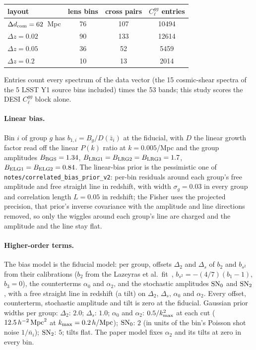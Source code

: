 \documentclass[11pt]{article}
\newcommand{\kmax}{k_{\rm max}}
\newcommand{\hMpc}{\,h/{\rm Mpc}}
\newcommand{\aunit}{\,h^{-2}\,{\rm Mpc}^2}
\newcommand{\dcom}{$\Delta d_{\rm com} = 62$~Mpc}
\newcommand{\us}{\_\allowbreak}
\begin{document}
\begin{center}
  \begin{tabular}{lccc}
    \hline
    layout & lens bins & cross pairs & $C_\ell^{gg}$ entries \\
    \hline
    \dcom{} & 76 & 107 & 10494 \\
    $\Delta z = 0.02$ & 90 & 133 & 12614 \\
    $\Delta z = 0.05$ & 36 & 52 & 5459 \\
    $\Delta z = 0.2$ & 10 & 13 & 2014 \\
    \hline
  \end{tabular}
\end{center}

\noindent Entries count every spectrum of the data vector (the 15
cosmic-shear spectra of the 5 LSST Y1 source bins included) times the
53 bands; this study scores the DESI $C_\ell^{gg}$ block alone.

\paragraph{Linear bias.}
Bin $i$ of group $g$ has $b_{1,i} = B_g/D(\bar{z}_i)$ at the fiducial,
with $D$ the linear growth factor read off the linear $P(k)$ ratio at
$k = 0.005$/Mpc and the group amplitudes $B_{\rm BGS} = 1.34$,
$B_{\rm LRG1} = B_{\rm LRG2} = B_{\rm LRG3} = 1.7$,
$B_{\rm ELG1} = B_{\rm ELG2} = 0.84$.  The linear-bias prior is the
pessimistic one of \texttt{notes/correlated\us bias\us prior\us v2}:
per-bin residuals around each group's free amplitude
and free straight line in redshift, with width $\sigma_g = 0.03$ in
every group and correlation length $L = 0.05$ in redshift; the Fisher
uses the projected precision, that prior's inverse covariance with the
amplitude and line directions removed, so only the wiggles around each
group's line are charged and the amplitude and the line stay flat.

\paragraph{Higher-order terms.}
The bias model is the fiducial model: per group, offsets $\Delta_2$ and
$\Delta_s$ of $b_2$ and $b_{s^2}$ from their calibrations
($b_2$ from the Lazeyras et al.\ fit~\cite{Lazeyras2016},
$b_{s^2} = -(4/7)(b_1 - 1)$, $b_3 = 0$), the counterterms $\alpha_0$
and $\alpha_2$, and the stochastic amplitudes ${\rm SN}_0$ and
${\rm SN}_2$, with a free straight line in redshift (a tilt) on
$\Delta_2$, $\Delta_s$, $\alpha_0$ and $\alpha_2$.  Every offset,
counterterm, stochastic amplitude and tilt is zero at the fiducial.
Gaussian prior widths per group: $\Delta_2$: $2.0$; $\Delta_s$: $1.0$;
$\alpha_0$ and $\alpha_2$: $0.5/\kmax^2$ at each cut ($12.5\aunit$ at
$\kmax = 0.2\hMpc$); ${\rm SN}_0$: $2$ (in units of the bin's Poisson
shot noise $1/\bar{n}_i$); ${\rm SN}_2$: $5$; tilts flat.  The paper model fixes $\alpha_2$ and its tilts at
zero in every bin.
\end{document}
